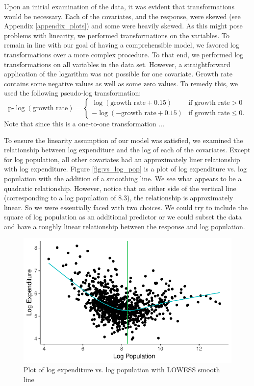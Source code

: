 \documentclass{article}\usepackage[]{graphicx}\usepackage[]{color}
\makeatletter
\def\maxwidth{ %
  \ifdim\Gin@nat@width>\linewidth
    \linewidth
  \else
    \Gin@nat@width
  \fi
}
\newenvironment{knitrout}{}{} %
\makeatother
\begin{document}
Upon an initial examination of the data, it was evident that transformations would be necessary. Each of the covariates, and the response, were skewed (see Appendix \ref{appendix_plots}) and some were heavily skewed. As this might pose problems with linearity, we performed transformations on the variables. To remain in line with our goal of having a comprehensible model, we favored log transformations over a more complex procedure. To that end, we performed log transformations on all variables in the data set.  However, a straightforward application of the logarithm was not possible for one covariate. Growth rate contains some negative values as well as some zero values. To remedy this, we used the following pseudo-log transformation:
\[
\text{p-}\log(\text{growth rate}) = %
  \begin{cases}
    \log(\text{growth rate} + 0.15) &\text{if growth rate} > 0 \\
    -\log(-\text{growth rate} + 0.15) &\text{if growth rate} \le 0.
  \end{cases}
\]
Note that since this is a one-to-one transformation ...

To ensure the linearity assumption of our model was satisfied, we examined the relationship between log expenditure and the log of each of the covariates. Except for log population, all other covariates had an approximately liner relationship with log expenditure. Figure \ref{fig:vs_log_pop} is a plot of log expenditure vs. log population with the addition of a smoothing line. We see what appears to be a quadratic relationship. However, notice that on either side of the vertical line (corresponding to a log population of $8.3$), the relationship is approximately linear. So we were essentially faced with two choices. We could try to include the square of log population as an additional predictor or we could subset the data and have a roughly linear relationship between the response and log population.


\begin{knitrout}
\color{fgcolor}\begin{figure}[h]
\includegraphics[width=\maxwidth]{figure/r_fig_vs_log_pop-1} \caption{\label{fig:vs_log_pop} Plot of log expenditure vs. log population with LOWESS smooth line}\label{fig:r fig_vs_log_pop}
\end{figure}


\end{knitrout}
\end{document}
